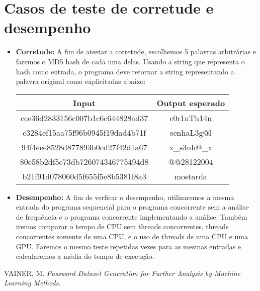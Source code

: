\documentclass[12pt, a4paper]{article}
\begin{document}
\section{Casos de teste de corretude e desempenho}
\begin{itemize}
    \item \textbf{Corretude:} A fim de atestar a corretude, escolhemos 5 palavras arbitrárias e faremos o MD5 hash de cada uma delas. Usando a string que representa o hash como entrada, o programa deve retornar a string representando a palavra original como explicitadas abaixo:
    \begin{center}
    \begin{tabular}{ |c|c| } 
     \hline
     Input & Output esperado \\
     \hline
     cce36d2833156c007b1c6c644828ad37 & c0r1nTh14n \\
     c3284ef15aa75f96b0945f19dad4b71f & senhaL3g@l \\
     94f4eee8528d877893b0cd27f42d1a67 & x\_s3nh@\_x \\
     80e58b2df5e73db726074346775494d8 & @@28122004 \\
     b21f91d078060d5f655f5e8b5381f8a3 & mostarda  \\
     \hline
    \end{tabular}

    \end{center}
    
    \item \textbf{Desempenho:} A fim de verficar o desempenho, utilizaremos a mesma entrada do programa sequencial para o programa concorrente sem a análise de frequência e o programa concorrente implementando a análise. Também iremos comparar o tempo de CPU sem threads concorrentes, threads concorrentes somente de uma CPU, e o uso de threads de uma CPU e uma GPU. Faremos o mesmo teste repetidas vezes para as mesmas entradas e calcularemos a média do tempo de execução.
\end{itemize}

\begin{thebibliography}{9}
    VAINER, M. \textit{Password Dataset Generation for Further Analysis by Machine Learning Methods}.


\end{thebibliography}
\end{document}
